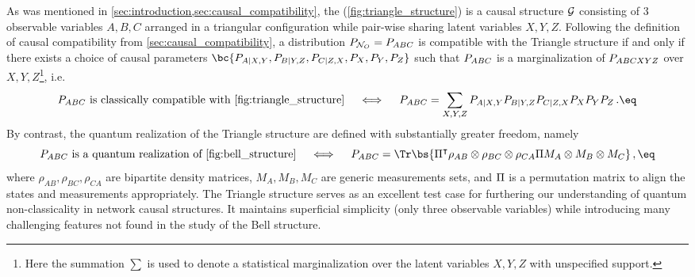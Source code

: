 \documentclass[aps, 10pt, english, twoside, pra, nofootinbib, tightenlines, longbibliography, superscriptaddress]{revtex4-1}
\begin{document}
    As was mentioned in \cref{sec:introduction,sec:causal_compatibility}, the  (\cref{fig:triangle_structure}) is a causal structure $\mathcal{G}$ consisting of $3$ observable variables $A, B, C$ arranged in a triangular configuration while pair-wise sharing latent variables $X, Y, Z$.
    Following the definition of causal compatibility from \cref{sec:causal_compatibility}, a distribution $\prob[\nodes_{O}] = \prob[ABC]$ is compatible with the Triangle structure if and only if there exists a choice of causal parameters $\bc{\prob[A|X,Y],\prob[B|Y,Z],\prob[C|Z,X],\prob[X],\prob[Y],\prob[Z]}$ such that
    $\prob[ABC]$ is a marginalization of $\prob[ABCXYZ]$ over $X, Y, Z$\footnote{Here the summation $\sum$ is used to denote a statistical marginalization over the latent variables $X,Y,Z$ with unspecified support.}, i.e.
    \[ \prob[ABC] \text{ is classically compatible with \cref{fig:triangle_structure}} \quad\iff\quad\prob[ABC] = \sum_{X,Y,Z}\prob[A|X,Y]\prob[B|Y,Z]\prob[C|Z,X]\prob[X]\prob[Y]\prob[Z]\,. \eq \label{eq:triangle_compatibility} \]
    By contrast, the quantum realization of the Triangle structure are defined with substantially greater freedom, namely
    \[ \prob[ABC] \text{ is a quantum realization of \cref{fig:bell_structure}} \quad\iff\quad\prob[ABC] = \Tr\bs{\netperm^\intercal \rho_{AB}\otimes\rho_{BC}\otimes\rho_{CA} \netperm M_{A}\otimes M_{B} \otimes M_{C}}\,, \eq \label{eq:triangle_Qcompatibility} \]
    where $\rho_{AB}, \rho_{BC}, \rho_{CA}$ are bipartite density matrices, $M_{A}, M_{B}, M_{C}$ are generic measurements sets, and $\Pi$ is a permutation matrix to align the states and measurements appropriately.
    The Triangle structure serves as an excellent test case for furthering our understanding of quantum non-classicality in network causal structures. It maintains superficial simplicity (only three observable variables) while introducing many challenging features not found in the study of the Bell structure.
\end{document}
